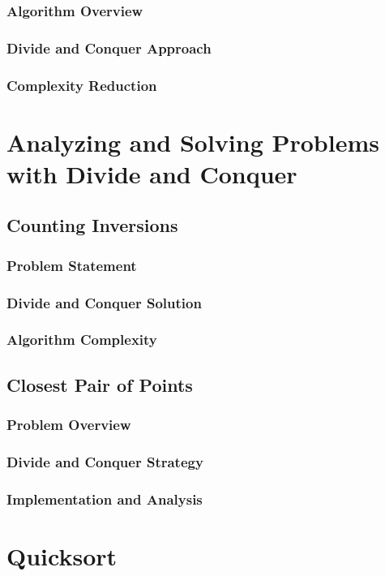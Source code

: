 \documentclass[12pt]{book} %
\begin{document}
\subsubsection{Algorithm Overview}
\subsubsection{Divide and Conquer Approach}
\subsubsection{Complexity Reduction}

\section{Analyzing and Solving Problems with Divide and Conquer}
\subsection{Counting Inversions}
\subsubsection{Problem Statement}
\subsubsection{Divide and Conquer Solution}
\subsubsection{Algorithm Complexity}
\subsection{Closest Pair of Points}
\subsubsection{Problem Overview}
\subsubsection{Divide and Conquer Strategy}
\subsubsection{Implementation and Analysis}

\section{Quicksort}
\end{document}
